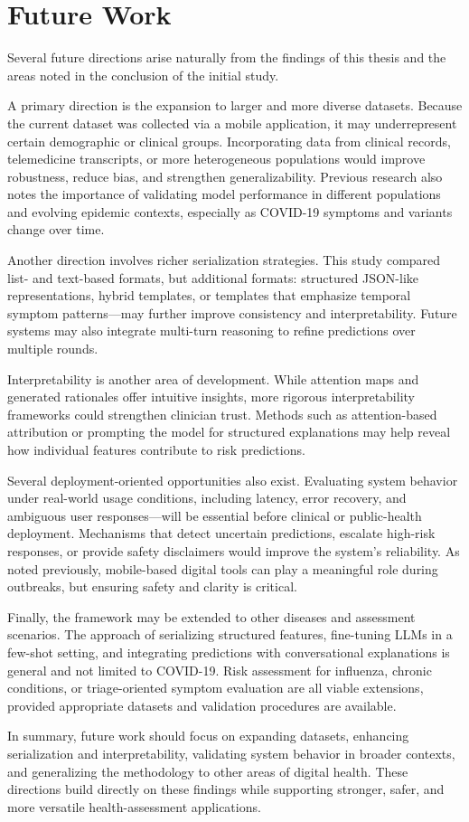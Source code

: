 \section{Future Work}

Several future directions arise naturally from the findings of this thesis and the areas noted in the conclusion of the initial study.

A primary direction is the expansion to larger and more diverse datasets. Because the current dataset was collected via a mobile application, it may underrepresent certain demographic or clinical groups. Incorporating data from clinical records, telemedicine transcripts, or more heterogeneous populations would improve robustness, reduce bias, and strengthen generalizability. Previous research also notes the importance of validating model performance in different populations and evolving epidemic contexts, especially as COVID-19 symptoms and variants change over time.

Another direction involves richer serialization strategies. This study compared list- and text-based formats, but additional formats: structured JSON-like representations, hybrid templates, or templates that emphasize temporal symptom patterns---may further improve consistency and interpretability. Future systems may also integrate multi-turn reasoning to refine predictions over multiple rounds.

Interpretability is another area of development. While attention maps and generated rationales offer intuitive insights, more rigorous interpretability frameworks could strengthen clinician trust. Methods such as attention-based attribution or prompting the model for structured explanations may help reveal how individual features contribute to risk predictions.

Several deployment-oriented opportunities also exist. Evaluating system behavior under real-world usage conditions, including latency, error recovery, and ambiguous user responses---will be essential before clinical or public-health deployment. Mechanisms that detect uncertain predictions, escalate high-risk responses, or provide safety disclaimers would improve the system’s reliability. As noted previously, mobile-based digital tools can play a meaningful role during outbreaks, but ensuring safety and clarity is critical.

Finally, the framework may be extended to other diseases and assessment scenarios. The approach of serializing structured features, fine-tuning LLMs in a few-shot setting, and integrating predictions with conversational explanations is general and not limited to COVID-19. Risk assessment for influenza, chronic conditions, or triage-oriented symptom evaluation are all viable extensions, provided appropriate datasets and validation procedures are available.

In summary, future work should focus on expanding datasets, enhancing serialization and interpretability, validating system behavior in broader contexts, and generalizing the methodology to other areas of digital health. These directions build directly on these findings while supporting stronger, safer, and more versatile health-assessment applications.
